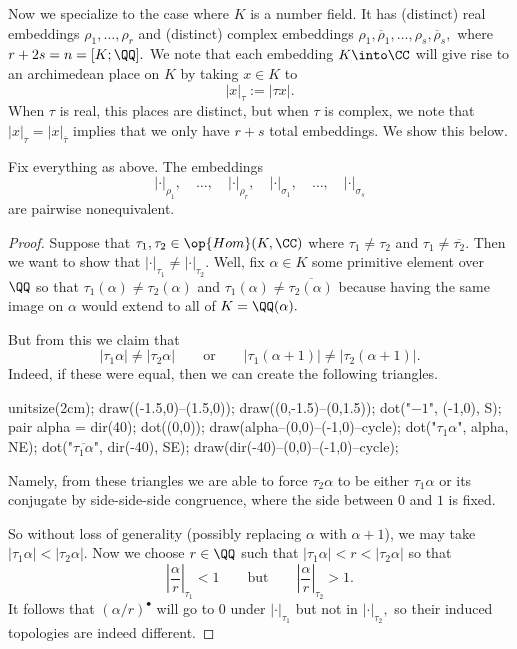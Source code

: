 Now we specialize to the case where $K$ is a number field. It has (distinct) real embeddings $\rho_1,\ldots,\rho_r$ and (distinct) complex embeddings $\rho_1,\overline\rho_1,\ldots,\rho_s,\overline\rho_s,$ where $r+2s=n=[K;\QQ].$ We note that each embedding $K\into\CC$ will give rise to an archimedean place on $K$ by taking $x\in K$ to
\[|x|_\tau:=|\tau x|.\]
When $\tau$ is real, this places are distinct, but when $\tau$ is complex, we note that $|x|_\tau=|x|_{\overline\tau}$ implies that we only have $r+s$ total embeddings. We show this below.
\begin{proposition}
	Fix everything as above. The embeddings
	\[|\cdot|_{\rho_1},\quad\ldots,\quad|\cdot|_{\rho_r},\quad|\cdot|_{\sigma_1},\quad\ldots,\quad|\cdot|_{\sigma_s}\]
	are pairwise nonequivalent.
\end{proposition}
\begin{proof}
	Suppose that $\tau_1,\tau_2\in\op{Hom}(K,\CC)$ where $\tau_1\ne\tau_2$ and $\tau_1\ne\overline{\tau_2}.$ Then we want to show that $|\cdot|_{\tau_1}\ne|\cdot|_{\tau_2}.$ Well, fix $\alpha\in K$ some primitive element over $\QQ$ so that $\tau_1(\alpha)\ne\tau_2(\alpha)$ and $\tau_1(\alpha)\ne\overline{\tau_2(\alpha)}$ because having the same image on $\alpha$ would extend to all of $K=\QQ(\alpha).$

	But from this we claim that
	\[|\tau_1\alpha|\ne|\tau_2\alpha|\qquad\text{or}\qquad|\tau_1(\alpha+1)|\ne|\tau_2(\alpha+1)|.\]
	Indeed, if these were equal, then we can create the following triangles.
	\begin{center}
		\begin{asy}
			unitsize(2cm);
			draw((-1.5,0)--(1.5,0));
			draw((0,-1.5)--(0,1.5));
			dot("$-1$", (-1,0), S);
			pair alpha = dir(40);
			dot((0,0));
			draw(alpha--(0,0)--(-1,0)--cycle);
			dot("$\tau_1\alpha$", alpha, NE);
			dot("$\overline{\tau_1\alpha}$", dir(-40), SE);
			draw(dir(-40)--(0,0)--(-1,0)--cycle);
		\end{asy}
	\end{center}
	Namely, from these triangles we are able to force $\tau_2\alpha$ to be either $\tau_1\alpha$ or its conjugate by side-side-side congruence, where the side between $0$ and $1$ is fixed.

	So without loss of generality (possibly replacing $\alpha$ with $\alpha+1$), we may take $|\tau_1\alpha|<|\tau_2\alpha|.$ Now we choose $r\in\QQ$ such that $|\tau_1\alpha|<r<|\tau_2\alpha|$ so that
	\[\left|\frac{\alpha}r\right|_{\tau_1}<1\qquad\text{but}\qquad\left|\frac{\alpha}r\right|_{\tau_2}>1.\]
	It follows that $(\alpha/r)^\bullet$ will go to $0$ under $|\cdot|_{\tau_1}$ but not in $|\cdot|_{\tau_2},$ so their induced topologies are indeed different.
\end{proof}

